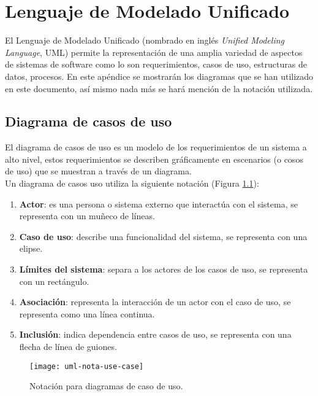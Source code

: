 \chapter{Lenguaje de Modelado Unificado}
El Lenguaje de Modelado Unificado (nombrado en inglés \textit{Unified Modeling Language}, UML) permite la representación de una amplia variedad de aspectos de sistemas de software como lo son requerimientos, casos de uso, estructuras de datos, procesos\cite{UMLClassroom}. En este apéndice se mostrarán los diagramas que se han utilizado en este documento, así mismo nada más se hará mención de la notación utilizada.
\section{Diagrama de casos de uso}\label{sec:uml-cu}
El diagrama de casos de uso es un modelo de los requerimientos de un sistema a alto nivel, estos requerimientos se describen gráficamente en escenarios (o cosos de uso) que se muestran a través de un diagrama\cite{UMLClassroom, SoftwareEngineeringUML}.\\
Un diagrama de casos uso utiliza la siguiente notación\cite{UMLClassroom, SoftwareEngineeringUML} (Figura \ref{fig:uml-nota-use-case}):
\begin{enumerate}
  \item \textbf{Actor}: es una persona o sistema externo que interactúa con el sistema, se representa con un muñeco de líneas.
  \item \textbf{Caso de uso}: describe una funcionalidad del sistema, se representa con una elipse.
  \item \textbf{Límites del sistema}: separa a los actores de los casos de uso, se representa con un rectángulo.
  \item \textbf{Asociación}: representa la interacción de un actor con el caso de uso, se representa como una línea continua.
  \item \textbf{Inclusión}: indica dependencia entre casos de uso, se representa con una flecha de línea de guiones.
\end{enumerate}
\begin{figure}[h]
  \centering
  \texttt{[image: uml-nota-use-case]}
  \caption{Notación para diagramas de caso de uso\cite{SoftwareEngineeringUML}.}
  \label{fig:uml-nota-use-case}
\end{figure}
\pagebreak
